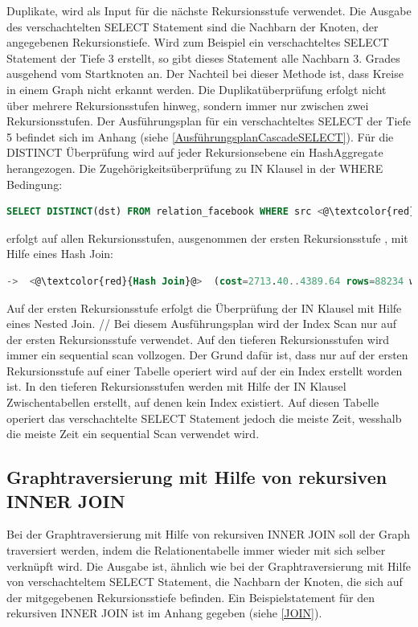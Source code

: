 Duplikate, wird als Input für die nächste Rekursionsstufe verwendet.
Die Ausgabe des verschachtelten SELECT Statement sind die Nachbarn der Knoten, der angegebenen Rekursionstiefe. Wird zum Beispiel ein
verschachteltes SELECT Statement der Tiefe 3 erstellt, so gibt dieses Statement alle Nachbarn 3. Grades ausgehend vom Startknoten an. Der Nachteil bei dieser Methode ist, dass
Kreise in einem Graph nicht erkannt werden. Die Duplikatüberprüfung erfolgt nicht über mehrere Rekursionsstufen hinweg, sondern immer nur zwischen zwei Rekursionsstufen.
Der Ausführungsplan für ein verschachteltes SELECT der Tiefe 5 befindet sich im Anhang (siehe \ref{AusführungsplanCascadeSELECT}). Für die DISTINCT Überprüfung
wird auf jeder Rekursionsebene ein HashAggregate herangezogen. Die Zugehörigkeitsüberprüfung zu IN Klausel in der WHERE Bedingung:
\begin{lstlisting}[language=SQL,caption = IN Klausel,frame=single, label={INKlauselFacebook} ]
    SELECT DISTINCT(dst) FROM relation_facebook WHERE src <@\textcolor{red}{IN}@> ()
\end{lstlisting}
erfolgt auf allen Rekursionsstufen, ausgenommen der ersten Rekursionsstufe , mit Hilfe eines Hash Join:
\begin{lstlisting}[language=SQL,caption = Aufruf der DISTINCT Funktion,frame=single, label={WhereConditionCTE} ]
    ->  <@\textcolor{red}{Hash Join}@>  (cost=2713.40..4389.64 rows=88234 width=4) (actual time=11.821..17.797 rows=1709 loops=1)
\end{lstlisting}
 Auf der ersten Rekursionsstufe erfolgt die Überprüfung der IN Klausel mit Hilfe eines Nested Join. // Bei diesem Ausführungsplan wird der Index Scan nur auf der ersten
Rekursionsstufe verwendet. Auf den tieferen Rekursionsstufen wird immer ein sequential scan vollzogen. Der Grund dafür ist, dass nur auf der ersten Rekursionsstufe auf
einer Tabelle operiert wird auf der ein Index erstellt worden ist. In den tieferen Rekursionsstufen werden mit Hilfe der IN Klausel Zwischentabellen erstellt, auf denen kein Index existiert.
 Auf diesen Tabelle operiert das verschachtelte SELECT Statement jedoch die meiste Zeit, wesshalb die meiste Zeit ein sequential Scan verwendet wird.
\subsection{Graphtraversierung mit Hilfe von rekursiven INNER JOIN}
\label{postgresInnerJoin}
Bei der Graphtraversierung mit Hilfe von rekursiven INNER JOIN soll der Graph traversiert werden, indem die Relationentabelle immer wieder mit sich selber verknüpft wird.
Die Ausgabe ist, ähnlich wie bei der Graphtraversierung mit Hilfe von verschachteltem SELECT Statement, die Nachbarn der Knoten, die sich auf der mitgegebenen Rekursionsstiefe
befinden. Ein Beispielstatement für den rekursiven INNER JOIN ist im Anhang gegeben (siehe \ref{JOIN}).

